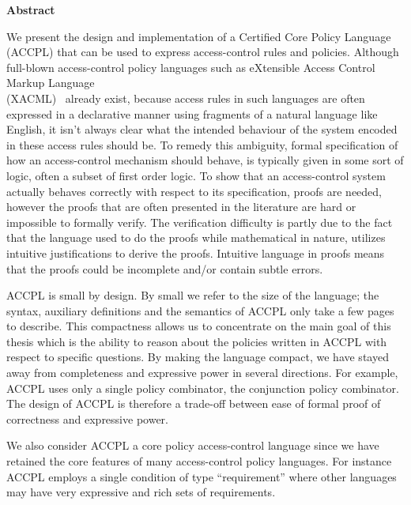
\begin{center}\textbf{Abstract}\end{center}

We present the design and implementation of a Certified Core Policy Language (ACCPL) that can be used to express access-control rules and policies. Although full-blown access-control policy languages such as eXtensible Access Control Markup Language \\(XACML)~\cite{xacml3pdf} already exist, because access rules in such languages are often expressed in a declarative manner using fragments of a natural language like English, it isn't always clear what the intended behaviour of the system encoded in these access rules should be. To remedy this ambiguity, formal specification of how an access-control mechanism should behave, is typically given in some sort of logic, often a subset of first order logic. To show that an access-control system actually behaves correctly with respect to its specification, proofs are needed, however the proofs that are often presented in the literature are hard or impossible to formally verify. The verification difficulty is partly due to the fact that the language used to do the proofs while mathematical in nature, utilizes intuitive justifications to derive the proofs. Intuitive language in proofs means that the proofs could be incomplete and/or contain subtle errors.

ACCPL is small by design. By small we refer to the size of the language; the syntax, auxiliary definitions and the semantics of ACCPL only take a few pages to describe. This compactness allows us to concentrate on the main goal of this thesis which is the ability to reason about the policies written in ACCPL with respect to specific questions. By making the language compact, we have stayed away from completeness and expressive power in several directions. For example, ACCPL uses only a single policy combinator, the conjunction policy combinator. The design of ACCPL is therefore a trade-off between ease of formal proof of correctness and expressive power.

We also consider ACCPL a core policy access-control language since we have retained the core features of many access-control policy languages. For instance ACCPL employs a single condition of type ``requirement'' where other languages may have very expressive and rich sets of requirements. 


\cleardoublepage

